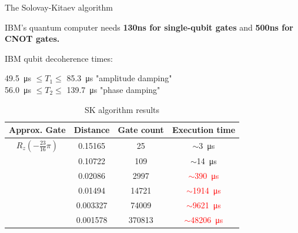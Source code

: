 \documentclass[10pt]{beamer}
\begin{document}
{
\begin{frame}{The Solovay-Kitaev algorithm}

IBM's quantum computer needs \textbf{130ns for single-qubit gates} and \textbf{500ns for CNOT gates.}

IBM qubit decoherence times:

\SI{49.5}{\micro\second} $\leq T_1 \leq$ \SI{85.3}{\micro\second} "amplitude damping"\\
\SI{56.0}{\micro\second} $\leq T_2 \leq$ \SI{139.7}{\micro\second} "phase damping"
\vspace{6mm}


\begin{table}
    \begin{tabular}{c| c |c |c }
      \toprule
      Approx. Gate & Distance & Gate count & Execution time\\
      \midrule
      $R_z(-\frac{23}{16}\pi)$ & 0.15165 & 25 & \textcolor{emerald}{$\sim$\SI{3}{\micro\second}}\\
       & 0.10722 & 109 & \textcolor{emerald}{$\sim$\SI{14}{\micro\second}}\\
       & 0.02086 & 2997 & \textcolor{red}{$\sim$\SI{390}{\micro\second}}\\
       & 0.01494 & 14721 & \textcolor{red}{$\sim$\SI{1914}{\micro\second}}\\
       & 0.003327 & 74009 & \textcolor{red}{$\sim$\SI{9621}{\micro\second}}\\
       & 0.001578 & 370813 & \textcolor{red}{$\sim$\SI{48206}{\micro\second}}\\
      \bottomrule
    \end{tabular}
    \caption{SK algorithm results}
  \end{table}
 

\end{frame}
}
\end{document}
